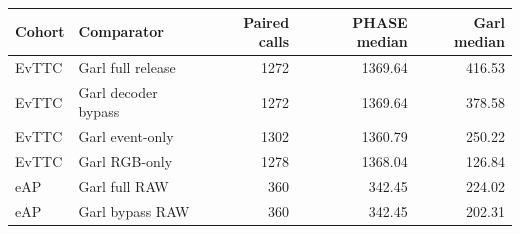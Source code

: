 \begin{tabular}{llrrr}
\toprule
Cohort & Comparator & Paired calls & PHASE median & Garl median \\
\midrule
EvTTC & Garl full release & 1272 & 1369.64 & 416.53 \\
EvTTC & Garl decoder bypass & 1272 & 1369.64 & 378.58 \\
EvTTC & Garl event-only & 1302 & 1360.79 & 250.22 \\
EvTTC & Garl RGB-only & 1278 & 1368.04 & 126.84 \\
eAP & Garl full RAW & 360 & 342.45 & 224.02 \\
eAP & Garl bypass RAW & 360 & 342.45 & 202.31 \\
\bottomrule
\end{tabular}
